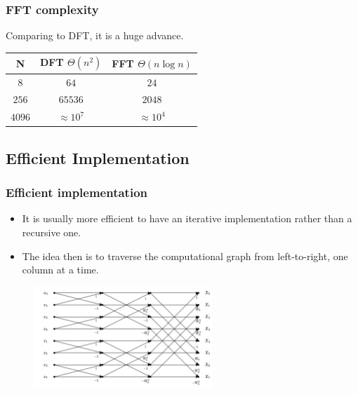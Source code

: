 \documentclass{beamer}
\begin{document}
\begin{frame}
    \frametitle{FFT complexity}
    Comparing to DFT, it is a huge advance.
    \begin{table}[]
    \begin{tabular}{c|c|c}
    \textbf{N}    & \textbf{DFT} $\Theta(n^2)$ & \textbf{FFT} $\Theta(n \log n)$ \\ \hline
    $8$    & $64$                             & $24$                                  \\ \hline
    $256$  & $65536$                          & $2048$                                \\ \hline
    $4096$ & $\approx 10^7$                 & $\approx 10^4$                      \\
    \end{tabular}
    \end{table}
\end{frame}

\subsection{Efficient Implementation}
\begin{frame}
    \frametitle{Efficient implementation}
    \begin{itemize}
        \item It is usually more efficient to have an iterative implementation rather than a recursive one.
	\item The idea then is to traverse the computational graph from left-to-right, one column at a time.
    \end{itemize}
    \begin{figure}
        \centering
        \includegraphics[width=0.6\textwidth]{cooleytukey_8example.png}
    \end{figure}
\end{frame}
\end{document}
